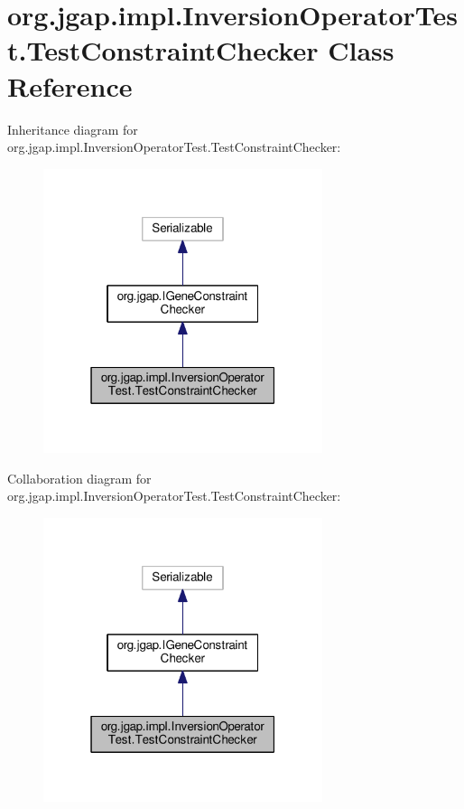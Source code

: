 \hypertarget{classorg_1_1jgap_1_1impl_1_1_inversion_operator_test_1_1_test_constraint_checker}{\section{org.\-jgap.\-impl.\-Inversion\-Operator\-Test.\-Test\-Constraint\-Checker Class Reference}
\label{classorg_1_1jgap_1_1impl_1_1_inversion_operator_test_1_1_test_constraint_checker}
}


Inheritance diagram for org.\-jgap.\-impl.\-Inversion\-Operator\-Test.\-Test\-Constraint\-Checker\-:
\nopagebreak
\begin{figure}[H]
\begin{center}
\leavevmode
\includegraphics[width=232pt]{classorg_1_1jgap_1_1impl_1_1_inversion_operator_test_1_1_test_constraint_checker__inherit__graph}
\end{center}
\end{figure}


Collaboration diagram for org.\-jgap.\-impl.\-Inversion\-Operator\-Test.\-Test\-Constraint\-Checker\-:
\nopagebreak
\begin{figure}[H]
\begin{center}
\leavevmode
\includegraphics[width=232pt]{classorg_1_1jgap_1_1impl_1_1_inversion_operator_test_1_1_test_constraint_checker__coll__graph}
\end{center}
\end{figure}
